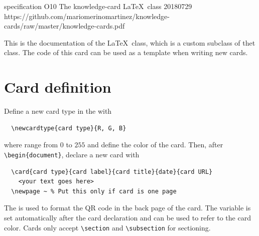 \documentclass{knowledge-cards}
\begin{document}
  
\card%
{specification}%
{O10}%
{The knowledge-card \LaTeX\ class}%
{20180729}%
{https://github.com/mariomerinomartinez/knowledge-cards/raw/master/knowledge-cards.pdf}

This is the documentation of the
 \LaTeX\ class, 
which is a custom subclass of thet  class. The code of this card can be used as a template when writing new cards.

\section{Card definition}
 
Define a new card type in the  
with
%
{ \color{\cardtype}%
\begin{verbatim}
  \newcardtype{card type}{R, G, B}
\end{verbatim}
}%
%
\noindent where  range from $0$ to $255$ and 
define the color of the card.
Then, after {\color{\cardtype} \verb|\begin{document}|}, 
declare a new card with
%
{\color{\cardtype}%
\begin{verbatim}
  \card{card type}{card label}{card title}{date}{card URL}
    <your text goes here> 
  \newpage ~ % Put this only if card is one page
\end{verbatim}
}%
%
\noindent 
The  is used to format the QR code in the back page
of the card.
The variable  is set automatically after the card declaration and can be used
to refer to the card color. 
Cards only accept {\color{\cardtype}\verb|\section|}
and {\color{\cardtype}\verb|\subsection|} for sectioning.
\end{document}
